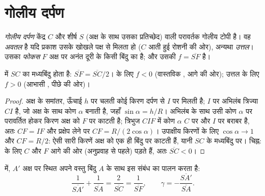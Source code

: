 \section{गोलीय दर्पण}

\begin{definition}[गोलीय दर्पण]\label{def:b1:mirrors-thin-lenses:mirror}
\emph{गोलीय दर्पण} केंद्र $C$ और शीर्ष $S$ (अक्ष के साथ उसका प्रतिच्छेद) वाली
परावर्तक गोलीय टोपी है। वह \emph{अवतल} है यदि प्रकाश उसके खोखले पक्ष से
मिलता हो ($C$ आती हुई रोशनी की ओर), अन्यथा \emph{उत्तल}। उसका \emph{फोकस}
$F$ अक्ष पर अनंत दूरी के किसी बिंदु का  है; और उसकी 
$f = \overline{SF}$ है।
\end{definition}

\begin{proposition}[गोलीय दर्पण का फोकस]\label{prop:b1:mirrors-thin-lenses:focus}
 में  $SC$ का मध्यबिंदु होता है:
$\overline{SF} = \overline{SC}/2$।  के लिए $f < 0$ (वास्तविक
, आगे की ओर); उत्तल के लिए $f > 0$ (आभासी , पीछे की ओर)।
\end{proposition}

\begin{proof}
अक्ष के समांतर, ऊँचाई $h$ पर चलती कोई किरण दर्पण से $I$ पर मिलती है; $I$ पर
अभिलंब त्रिज्या $CI$ है, जो अक्ष के साथ कोण $\alpha$ बनाती है, जहाँ
$\sin\alpha = h/R$। अभिलंब के साथ उसी कोण $\alpha$ पर परावर्तित होकर किरण अक्ष
को $F$ पर काटती है; त्रिभुज $CIF$ में कोण $\alpha$ $C$ पर और $I$ पर बराबर है,
अतः $CF = IF$ और प्रक्षेप लेने पर
$CF = R/(2\cos\alpha)$। उपाक्षीय किरणों के लिए $\cos\alpha \to 1$ और
$CF = R/2$: ऐसी सारी किरणें अक्ष को एक ही बिंदु पर काटती हैं, यानी
$SC$ के मध्यबिंदु पर। चिह्न:  के लिए $C$ और $F$ आगे की ओर
(अनुप्रवाह से पहले) पड़ते हैं, अतः $\overline{SC} < 0$।
\end{proof}

\begin{theorem}[गोलीय दर्पण के लिए संयुग्मन]\label{thm:b1:mirrors-thin-lenses:mirrorconj}
 में,  $A'$ अक्ष पर स्थित अपने वस्तु बिंदु $A$ के साथ
इस संबंध का पालन करता है:
\[
\frac{1}{\overline{SA'}} + \frac{1}{\overline{SA}} = \frac{2}{\overline{SC}}
= \frac{1}{\overline{SF}},
\qquad
\gamma = -\frac{\overline{SA'}}{\overline{SA}} .
\]
\end{theorem}

